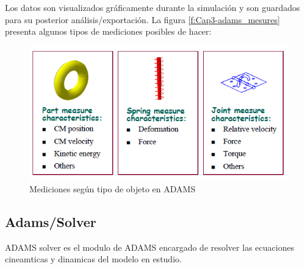         Los datos son visualizados gráficamente durante la simulación y son guardados para su posterior análisis/exportación. La figura \eqref{f:Cap3-adams_mesures} presenta algunos tipos de mediciones posibles de hacer:
        
        \begin{figure}[H]
            \centering
           \includegraphics[width=0.8\linewidth]{Main/Chapter3/Images3/papeo/mesures.png}
            \caption{Mediciones según tipo de objeto en ADAMS \cite{adams-basic}}
            \label{f:Cap3-adams_mesures}
        \end{figure} 
        
        
        
        
        
        
    \subsection{Adams/Solver}
        
        ADAMS solver es el modulo de ADAMS encargado de resolver las ecuaciones cineamticas y dinamicas del modelo en estudio. 
        
        
        

    
    
        
        
